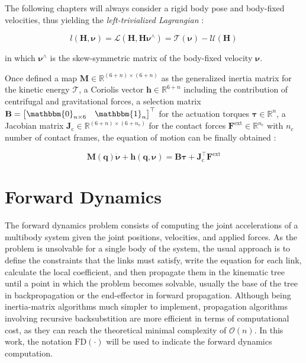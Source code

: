 The following chapters will always consider a rigid body pose and body-fixed velocities, thus yielding the \textit{left-trivialized Lagrangian} \citep{traversaro_modelling_2019}:

\begin{equation}
    l(\mathbf{H}, \boldsymbol{\nu}) = \mathcal{L}(\mathbf{H}, \mathbf{H}\boldsymbol{\nu}^\wedge) = \mathcal{T}(\boldsymbol{\nu}) - \mathcal{U}(\mathbf{H})
\end{equation}

in which $\boldsymbol{\nu}^\wedge$ is the skew-symmetric matrix of the body-fixed velocity $\boldsymbol{\nu}$.

Once defined a map $\mathbf{M} \in \mathbb{R}^{(6+n) \times (6+n)}$ as the generalized inertia matrix for the kinetic energy $\mathcal{T}$, a Coriolis vector $\mathbf{h} \in \mathbb{R} ^{6+n}$ including the contribution of centrifugal and gravitational forces, a selection matrix $\mathbf{B} = \begin{bmatrix} \mathbbm{0}_{n\times6} & \mathbbm{1}_n \end{bmatrix}^\top$ for the actuation torques $\boldsymbol{\tau} \in \mathbb{R} ^n$, a Jacobian matrix $\mathbf{J} _\text{c} \in \mathbb{R} ^{(6+n) \times (6+n_c)}$ for the contact forces $\mathbf{F} ^\text{ext} \in \mathbb{R} ^{n_c}$ with $n_c$ number of contact frames, the equation of motion can be finally obtained \citep{SicilianoKhatib2008}:

\begin{equation}
    \label{eqn:equation_of_motion}
    \mathbf{M}(\mathbf{q}) \mathbf{\ddot{\boldsymbol{\nu}}} + \mathbf{h} (\mathbf{q}, \boldsymbol{\nu}) = \mathbf{B}\boldsymbol{\tau} + \mathbf{J}^\top _\text{c} \mathbf{F} ^\text{ext}
\end{equation}


\section{Forward Dynamics}
\label{sec:back_fd}

The forward dynamics problem consists of computing the joint accelerations of a multibody system given the joint positions, velocities, and applied forces. As the problem is unsolvable for a single body of the system, the usual approach is to define the constraints that the links must satisfy, write the equation for each link, calculate the local coefficient, and then propagate them in the kinematic tree until a point in which the problem becomes solvable, usually the base of the tree in backpropagation or the end-effector in forward propagation. Although being inertia-matrix algorithms much simpler to implement, propagation algorithms involving recursive backsubstition are more efficient in terms of computational cost, as they can reach the theoretical minimal complexity of $\mathcal{O}(n)$. In this work, the notation $\mathrm{FD}(\cdot)$ will be used to indicate the forward dynamics computation.

